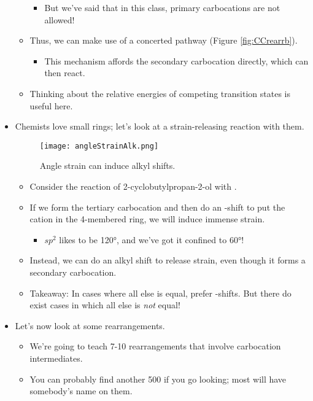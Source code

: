 \documentclass[../notes.tex]{subfiles}
\begin{document}
\begin{itemize}
\begin{itemize}
        \begin{itemize}
            \item But we've said that in this class, primary carbocations are not allowed!
        \end{itemize}
        \item Thus, we can make use of a concerted pathway (Figure \ref{fig:CCrearrb}).
        \begin{itemize}
            \item This mechanism affords the secondary carbocation directly, which can then react.
        \end{itemize}
        \item Thinking about the relative energies of competing transition states is useful here.
    \end{itemize}
    \pagebreak
    \item Chemists love small rings; let's look at a strain-releasing reaction with them.
    \begin{figure}[h!]
        \centering
        \texttt{[image: angleStrainAlk.png]}
        \caption{Angle strain can induce alkyl shifts.}
        \label{fig:angleStrainAlk}
    \end{figure}
    \begin{itemize}
        \item Consider the reaction of 2-cyclobutylpropan-2-ol with .
        \item If we form the tertiary carbocation and then do an -shift to put the cation in the 4-membered ring, we will induce immense strain.
        \begin{itemize}
            \item $sp^2$ likes to be \ang{120}, and we've got it confined to \ang{60}!
        \end{itemize}
        \item Instead, we can do an alkyl shift to release strain, even though it forms a secondary carbocation.
        \item Takeaway: In cases where all else is equal, prefer -shifts. But there do exist cases in which all else is \emph{not} equal!
    \end{itemize}
    \item Let's now look at some rearrangements.
    \begin{itemize}
        \item We're going to teach 7-10 rearrangements that involve carbocation intermediates.
        \item You can probably find another 500 if you go looking; most will have somebody's name on them.

\end{itemize}
\end{itemize}
\end{document}
